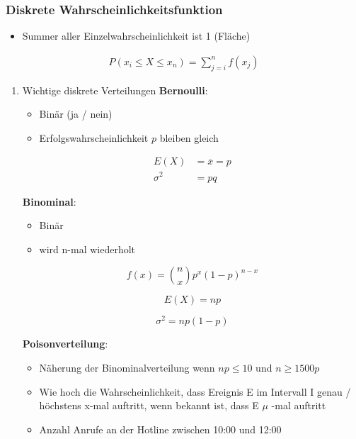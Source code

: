 \documentclass[11pt,twoside,landscape]{article}
\begin{document}
\begin{multicols}{3}
\subsubsection{Diskrete Wahrscheinlichkeitsfunktion}
\label{sec:orge7e1268}
\begin{itemize}
\item Summer aller Einzelwahrscheinlichkeit ist 1 (Fläche)
\end{itemize}
\begin{align*}
P(x_i \leq X \leq x_n) = \sum_{j=i}^{n} f(x_j)
\end{align*}

\begin{enumerate}
\item Wichtige diskrete Verteilungen
\label{sec:org2c59fd3}
\textbf{Bernoulli}:
\begin{itemize}
\item Binär (ja / nein)
\item Erfolgswahrscheinlichkeit \(p\) bleiben gleich
\end{itemize}
\begin{align*}
E(X) &= \overline{x} = p \\
\sigma^2 &= pq
\end{align*}

\textbf{Binominal}:
\begin{itemize}
\item Binär
\item wird n-mal wiederholt
\end{itemize}
\begin{equation*}
f(x) = \binom{n}{x}p^x(1-p)^{n-x}
\end{equation*}

\begin{equation*}
E(X) = np
\end{equation*}

\begin{equation*}
\sigma^2 = np(1-p)
\end{equation*}

\textbf{Poisonverteilung}:
\begin{itemize}
\item Näherung der Binominalverteilung wenn \(np \leq 10\) und \(n \geq 1500p\)
\item Wie hoch die Wahrscheinlichkeit, dass Ereignis E im Intervall I genau / höchstens x-mal auftritt, wenn bekannt ist, dass E \(\mu\) -mal auftritt
\item Anzahl Anrufe an der Hotline zwischen 10:00 und 12:00
\end{itemize}


\end{enumerate}
\end{multicols}
\end{document}

